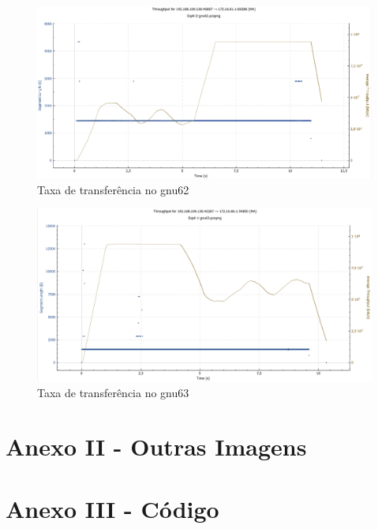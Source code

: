 \documentclass[article, a4paper, 11pt, oneside]{memoir}
\begin{document}
\begin{figure}[h]
	\centering
\includegraphics[scale=0.30]{exp6-step5-gnu62-graph.png}
\caption{Taxa de transferência no gnu62}
\end{figure}

\begin{figure}[h]
	\centering
\includegraphics[scale=0.30]{exp6-step5-gnu63-graph.png}
\caption{Taxa de transferência no gnu63}
\end{figure}

\section{Anexo II - Outras Imagens}


\section{Anexo III - Código}
\end{document}
